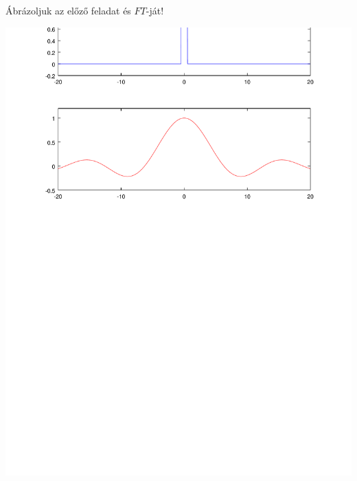 \feladat Ábrázoljuk az előző feladat és $FT$-ját!
\begin{center}
\includegraphics[scale=0.9]{negyszog}
\end{center}



